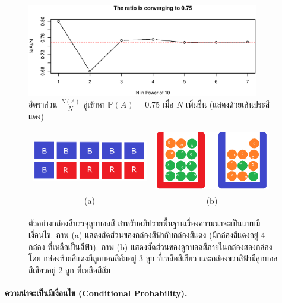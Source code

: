 %
\begin{figure}
\begin{center}
\includegraphics[width=4in]{02Prob/demoProb02.eps}
\end{center}
\caption{อัตราส่วน $\frac{N(A)}{N}$ ลู่เข้าหา $\mathbb{P}(A) = 0.75$ เมื่อ $N$ เพิ่มขึ้น (แสดงด้วยเส้นประสีแดง)}
\label{fig: prob demo N(A)/N}
\end{figure}
%

%
\begin{figure}
\begin{center}

\begin{tabular}{cc}
\includegraphics[width=2in]{02Prob/boxesMarked.png}
&
\includegraphics[width=2in]{02Prob/TwoUrnsMarked.png}
\\
(a) & (b) \\
\end{tabular} 
\end{center}
\caption{ตัวอย่างกล่องสีบรรจุลูกบอลสี สำหรับอภิปรายพื้นฐานเรื่องความน่าจะเป็นแบบมีเงื่อนไข.
ภาพ (a) แสดงสัดส่วนของกล่องสีฟ้ากับกล่องสีแดง (มีกล่องสีแดงอยู่ $4$ กล่อง ที่เหลือเป็นสีฟ้า).
ภาพ (b) แสดงสัดส่วนของลูกบอลสีภายในกล่องสองกล่อง โดย
กล่องซ้ายสีแดงมีลูกบอลสีส้มอยู่ $3$ ลูก ที่เหลือสีเขียว
และกล่องขวาสีฟ้ามีลูกบอลสีเขียวอยู่ $2$ ลูก ที่เหลือสีส้ม}
\label{fig: prob boxes}
\end{figure}
%

\paragraph{ความน่าจะเป็นมีเงื่อนไข (Conditional Probability).} 

